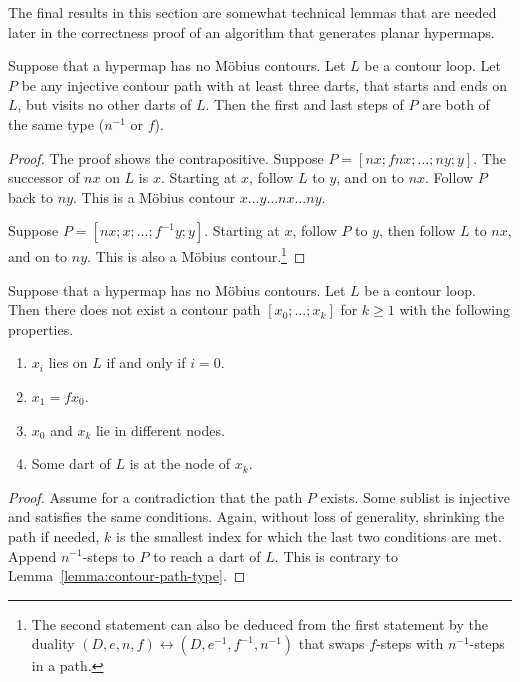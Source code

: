 The final results in this section are somewhat  technical lemmas that are
needed later in the correctness proof of an algorithm that generates planar hypermaps.

\begin{lemma}\label{lemma:contour-path-type}
Suppose that a hypermap has no M\"obius contours. Let $L$ be a
contour loop.  Let $P$ be any injective contour path with at least
three darts, that starts and ends on $L$, but visits no other darts of
$L$.  Then the first and last steps of $P$ are both of the same type
($n^{-1}$ or $f$).
\end{lemma}
%


\begin{proof} The proof shows the contrapositive.  Suppose $P=[n x;f n
x;\ldots;n y;y]$.  The successor of $n x$ on $L$ is $x$.  Starting
at $x$, follow $L$ to $y$, and on to $n x$.  Follow $P$ back to $n
y$.
This is a M\"obius contour $x\ldots y\ldots n x\ldots n y$.

Suppose $P=[n x;x;\ldots;f^{-1} y;y]$.  Starting at $x$, follow $P$ to
$y$, then follow $L$ to $n x$, and on to $n y$.  This is also a M\"obius
contour.\footnote{The second statement can also be deduced from the first statement
by the duality $(D,e,n,f)\leftrightarrow (D,e^{-1},f^{-1},n^{-1})$ that swaps
$f$-steps with $n^{-1}$-steps in a path.}
\end{proof}



\begin{lemma}\label{lemma:contour-f}
Suppose that a hypermap has no M\"obius contours.  Let $L$ be a
contour loop.  Then there does not exist a contour path
$[x_0;\ldots;x_k]$ for $k\ge 1$ with the following properties.
\begin{enumerate}
\item $x_i$ lies on $L$ if and only if $i=0$.
\item $x_1 = f x_0$.
\item $x_0$ and $x_k$ lie in different nodes.
\item Some dart of $L$ is at the node of $x_k$.
\end{enumerate}
\end{lemma}


\begin{proof} Assume for a contradiction that the path $P$ exists.
Some sublist is injective and satisfies the same conditions.  Again,
without loss of generality, shrinking the path if needed, $k$ is the
smallest index for which the last two conditions are met.  Append
$n^{-1}$-steps to $P$ to reach a dart of $L$.  This is contrary to
Lemma~\ref{lemma:contour-path-type}.
\end{proof}

